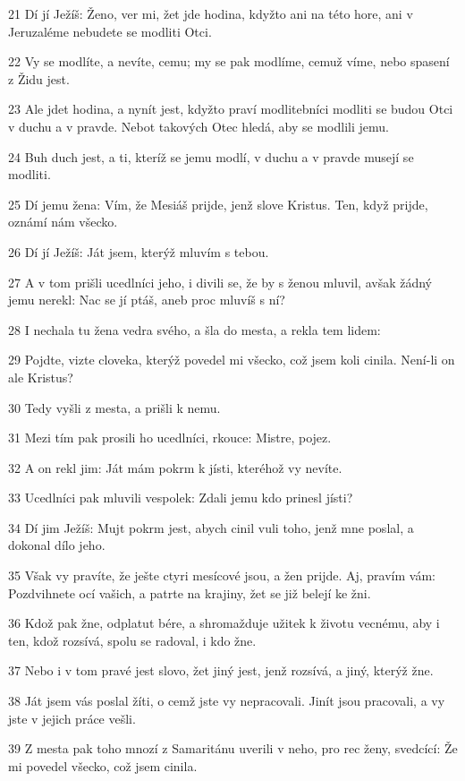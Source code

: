 \par 21 Dí jí Ježíš: Ženo, ver mi, žet jde hodina, kdyžto ani na této hore, ani v Jeruzaléme nebudete se modliti Otci.
\par 22 Vy se modlíte, a nevíte, cemu; my se pak modlíme, cemuž víme, nebo spasení z Židu jest.
\par 23 Ale jdet hodina, a nynít jest, kdyžto praví modlitebníci modliti se budou Otci v duchu a v pravde. Nebot takových Otec hledá, aby se modlili jemu.
\par 24 Buh duch jest, a ti, kteríž se jemu modlí, v duchu a v pravde musejí se modliti.
\par 25 Dí jemu žena: Vím, že Mesiáš prijde, jenž slove Kristus. Ten, když prijde, oznámí nám všecko.
\par 26 Dí jí Ježíš: Ját jsem, kterýž mluvím s tebou.
\par 27 A v tom prišli ucedlníci jeho, i divili se, že by s ženou mluvil, avšak žádný jemu nerekl: Nac se jí ptáš, aneb proc mluvíš s ní?
\par 28 I nechala tu žena vedra svého, a šla do mesta, a rekla tem lidem:
\par 29 Pojdte, vizte cloveka, kterýž povedel mi všecko, což jsem koli cinila. Není-li on ale Kristus?
\par 30 Tedy vyšli z mesta, a prišli k nemu.
\par 31 Mezi tím pak prosili ho ucedlníci, rkouce: Mistre, pojez.
\par 32 A on rekl jim: Ját mám pokrm k jísti, kteréhož vy nevíte.
\par 33 Ucedlníci pak mluvili vespolek: Zdali jemu kdo prinesl jísti?
\par 34 Dí jim Ježíš: Mujt pokrm jest, abych cinil vuli toho, jenž mne poslal, a dokonal dílo jeho.
\par 35 Však vy pravíte, že ješte ctyri mesícové jsou, a žen prijde. Aj, pravím vám: Pozdvihnete ocí vašich, a patrte na krajiny, žet se již belejí ke žni.
\par 36 Kdož pak žne, odplatut bére, a shromažduje užitek k životu vecnému, aby i ten, kdož rozsívá, spolu se radoval, i kdo žne.
\par 37 Nebo i v tom pravé jest slovo, žet jiný jest, jenž rozsívá, a jiný, kterýž žne.
\par 38 Ját jsem vás poslal žíti, o cemž jste vy nepracovali. Jinít jsou pracovali, a vy jste v jejich práce vešli.
\par 39 Z mesta pak toho mnozí z Samaritánu uverili v neho, pro rec ženy, svedcící: Že mi povedel všecko, což jsem cinila.
